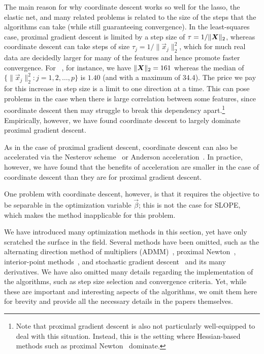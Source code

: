 The main reason for why coordinate descent works so well for the lasso, the elastic net, and many related problems is related to the size of the steps that the algorithms can take (while still guaranteeing convergence). In the least-squares case, proximal gradient descent is limited by a step size of \(\tau = 1/\lVert \boldsymbol{X}\rVert_2\), whereas coordinate descent can take steps of size \(\tau_j =1/\lVert \vec{x}_j \rVert_2^2\), which for much real data are decidedly larger for many of the features and hence promote faster convergence. For ~\parencite{lang1995}, for instance, we have \(\lVert \boldsymbol{X}\rVert_2 = 161\) whereas the median of \(\{\lVert \vec{x}_j\rVert_2^2 : j = 1,2,\dots,p\}\) is \(1.40\) (and with a maximum of 34.4). The price we pay for this increase in step size is a limit to one direction at a time. This can pose problems in the case when there is large correlation between some features, since coordinate descent then may struggle to break this dependency apart.\footnote{Note that proximal gradient descent is also not particularly well-equipped to deal with this situation. Instead, this is the setting where Hessian-based methods such as proximal Newton~\parencite{lee2014} dominate.} Empirically, however, we have found coordinate descent to largely dominate proximal gradient descent.

As in the case of proximal gradient descent, coordinate descent can also be accelerated via the Nesterov scheme~\parencite{nesterov1983} or Anderson acceleration~\parencite{bertrand2021}. In practice, however, we have found that the benefits of acceleration are smaller in the case of coordinate descent than they are for proximal gradient descent.

One problem with coordinate descent, however, is that it requires the objective to be separable in the optimization variable \(\vec{\beta}\); this is not the case for SLOPE, which makes the method inapplicable for this problem.

We have introduced many optimization methods in this section, yet have only scratched the surface in the field. Several methods have been omitted, such as the alternating direction method of multipliers (ADMM)~\parencite{boyd2010}, proximal Newton~\parencite{lee2014}, interior-point methods~\parencite{kim2007}, and stochastic gradient descent~\parencite{robbins1951,bottou2010} and its many derivatives. We have also omitted many details regarding the implementation of the algorithms, such as step size selection and convergence criteria. Yet, while these are important and interesting aspects of the algorithms, we omit them here for brevity and provide all the necessary details in the papers themselves.

